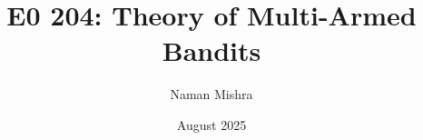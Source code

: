 \documentclass[12pt]{report}
\title{E0 204: Theory of Multi-Armed Bandits}
\author{Naman Mishra}
\date{August 2025}
\begin{document}
\maketitle
\tableofcontents
\listoflecture
    
\end{document}
